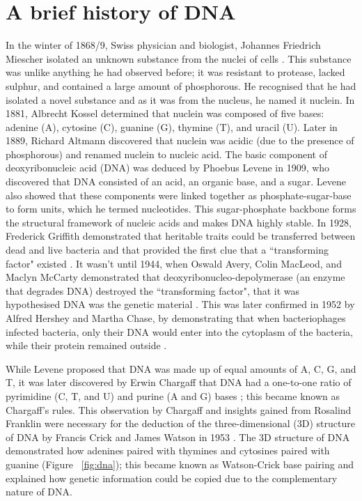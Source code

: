 \section{A brief history of DNA}

In the winter of 1868/9, Swiss physician and biologist, Johannes Friedrich Miescher isolated an unknown substance from the nuclei of cells \citep{dahm2008discovering}. This substance was unlike anything he had observed before; it was resistant to protease, lacked sulphur, and contained a large amount of phosphorous. He recognised that he had isolated a novel substance and as it was from the nucleus, he named it nuclein. In 1881, Albrecht Kossel determined that nuclein was composed of five bases: adenine (A), cytosine (C), guanine (G), thymine (T), and uracil (U). Later in 1889, Richard Altmann discovered that nuclein was acidic (due to the presence of phosphorous) and renamed nuclein to nucleic acid. The basic component of deoxyribonucleic acid (DNA) was deduced by Phoebus Levene in 1909, who discovered that DNA consisted of an acid, an organic base, and a sugar. Levene also showed that these components were linked together as phosphate-sugar-base to form units, which he termed nucleotides. This sugar-phosphate backbone forms the structural framework of nucleic acids and makes DNA highly stable. In 1928, Frederick Griffith demonstrated that heritable traits could be transferred between dead and live bacteria and that provided the first clue that a ``transforming factor" existed \citep{griffith1928significance}. It wasn't until 1944, when Oswald Avery, Colin MacLeod, and Maclyn McCarty demonstrated that deoxyribonucleo-depolymerase (an enzyme that degrades DNA) destroyed the ``transforming factor", that it was hypothesised DNA was the genetic material \citep{avery1944studies}. This was later confirmed in 1952 by Alfred Hershey and Martha Chase, by demonstrating that when bacteriophages infected bacteria, only their DNA would enter into the cytoplasm of the bacteria, while their protein remained outside \citep{hershey1952independent}.

While Levene proposed that DNA was made up of equal amounts of A, C, G, and T, it was later discovered by Erwin Chargaff that DNA had a one-to-one ratio of pyrimidine (C, T, and U) and purine (A and G) bases \citep{pmid14938364, pmid14945441}; this became known as Chargaff's rules. This observation by Chargaff and insights gained from Rosalind Franklin were necessary for the deduction of the three-dimensional (3D) structure of DNA by Francis Crick and James Watson in 1953 \citep{WATSON_1953}. The 3D structure of DNA demonstrated how adenines paired with thymines and cytosines paired with guanine (Figure ~\ref{fig:dna}); this became known as Watson-Crick base pairing and explained how genetic information could be copied due to the complementary nature of DNA.

